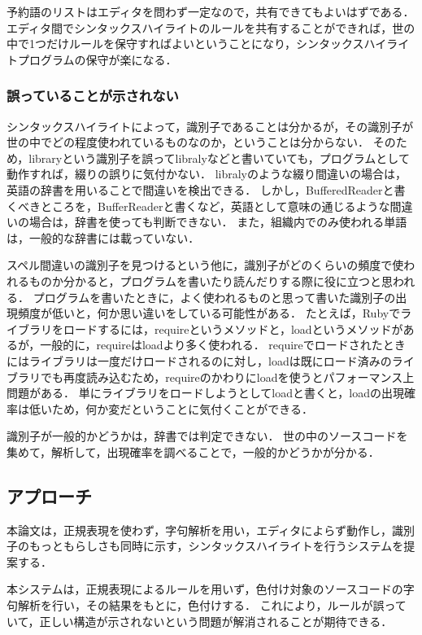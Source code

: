\documentclass{cs-thesis}
\begin{document}
  予約語のリストはエディタを問わず一定なので，共有できてもよいはずである．
  エディタ間でシンタックスハイライトのルールを共有することができれば，世の中で1つだけルールを保守すればよいということになり，シンタックスハイライトプログラムの保守が楽になる．

  \subsubsection{誤っていることが示されない}
  シンタックスハイライトによって，識別子であることは分かるが，その識別子が世の中でどの程度使われているものなのか，ということは分からない．
  そのため，libraryという識別子を誤ってlibralyなどと書いていても，プログラムとして動作すれば，綴りの誤りに気付かない．
  libralyのような綴り間違いの場合は，英語の辞書を用いることで間違いを検出できる．
  しかし，BufferedReaderと書くべきところを，BufferReaderと書くなど，英語として意味の通じるような間違いの場合は，辞書を使っても判断できない．
  また，組織内でのみ使われる単語は，一般的な辞書には載っていない．

  スペル間違いの識別子を見つけるという他に，識別子がどのくらいの頻度で使われるものか分かると，プログラムを書いたり読んだりする際に役に立つと思われる．
  プログラムを書いたときに，よく使われるものと思って書いた識別子の出現頻度が低いと，何か思い違いをしている可能性がある．
  たとえば，Rubyでライブラリをロードするには，requireというメソッドと，loadというメソッドがあるが，一般的に，requireはloadより多く使われる．
  requireでロードされたときにはライブラリは一度だけロードされるのに対し，loadは既にロード済みのライブラリでも再度読み込むため，requireのかわりにloadを使うとパフォーマンス上問題がある．
  単にライブラリをロードしようとしてloadと書くと，loadの出現確率は低いため，何か変だということに気付くことができる．

  識別子が一般的かどうかは，辞書では判定できない．
  世の中のソースコードを集めて，解析して，出現確率を調べることで，一般的かどうかが分かる．

 \subsection{アプローチ}
 本論文は，正規表現を使わず，字句解析を用い，エディタによらず動作し，識別子のもっともらしさも同時に示す，シンタックスハイライトを行うシステムを提案する．

 本システムは，正規表現によるルールを用いず，色付け対象のソースコードの字句解析を行い，その結果をもとに，色付けする．
 これにより，ルールが誤っていて，正しい構造が示されないという問題が解消されることが期待できる．
\end{document}
